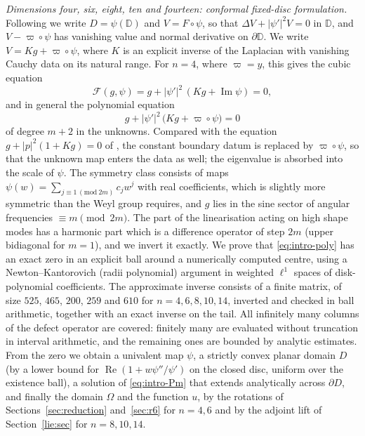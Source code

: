 \documentclass[11pt]{amsart}
\theoremstyle{definition}
\theoremstyle{remark}
\numberwithin{equation}{section}
\newcommand{\D}{\mathbb{D}}
\newcommand{\Fc}{\mathcal{F}}
\DeclareMathOperator{\re}{Re}
\DeclareMathOperator{\im}{Im}
\begin{document}
\emph{Dimensions four, six, eight, ten and fourteen: conformal fixed-disc formulation.} Following \cite{CS26} we write $D=\psi(\D)$ and $V=F\circ\psi$, so that $\Delta V+|\psi'|^2V=0$ in $\D$, and $V-\varpi\circ\psi$ has vanishing value and normal derivative on $\partial\D$. We write $V=Kg+\varpi\circ\psi$, where $K$ is an explicit inverse of the Laplacian with vanishing Cauchy data on its natural range. For $n=4$, where $\varpi=y$, this gives the cubic equation
\begin{equation}\label{eq:intro-cubic}
\Fc(g,\psi)=g+|\psi'|^2\,(Kg+\im\psi)=0,
\end{equation}
and in general the polynomial equation
\begin{equation}\label{eq:intro-poly}
g+|\psi'|^2\,\big(Kg+\varpi\circ\psi\big)=0
\end{equation}
of degree $m+2$ in the unknowns. Compared with the equation $g+|p|^2(1+Kg)=0$ of \cite{CS26}, the constant boundary datum is replaced by $\varpi\circ\psi$, so that the unknown map enters the data as well; the eigenvalue is absorbed into the scale of $\psi$. The symmetry class consists of maps $\psi(w)=\sum_{j\equiv1\,(\mathrm{mod}\ 2m)}c_jw^j$ with real coefficients, which is slightly more symmetric than the Weyl group requires, and $g$ lies in the sine sector of angular frequencies $\equiv m\pmod{2m}$. The part of the linearisation acting on high shape modes has a harmonic part which is a difference operator of step $2m$ (upper bidiagonal for $m=1$), and we invert it exactly. We prove that \eqref{eq:intro-poly} has an exact zero in an explicit ball around a numerically computed centre, using a Newton--Kantorovich (radii polynomial) argument in weighted $\ell^1$ spaces of disk-polynomial coefficients. The approximate inverse consists of a finite matrix, of size $525$, $465$, $200$, $259$ and $610$ for $n=4,6,8,10,14$, inverted and checked in ball arithmetic, together with an exact inverse on the tail. All infinitely many columns of the defect operator are covered: finitely many are evaluated without truncation in interval arithmetic, and the remaining ones are bounded by analytic estimates. From the zero we obtain a univalent map $\psi$, a strictly convex planar domain $D$ (by a lower bound for $\re(1+w\psi''/\psi')$ on the closed disc, uniform over the existence ball), a solution of \eqref{eq:intro-Pm} that extends analytically across $\partial D$, and finally the domain $\Omega$ and the function $u$, by the rotations of Sections~\ref{sec:reduction} and~\ref{sec:r6} for $n=4,6$ and by the adjoint lift of Section~\ref{lie:sec} for $n=8,10,14$.
\end{document}
